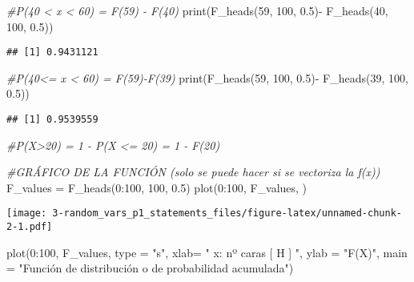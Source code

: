 \documentclass[
]{article}
\newenvironment{Shaded}{\begin{snugshade}}{\end{snugshade}}
\newcommand{\AttributeTok}[1]{\textcolor[rgb]{0.77,0.63,0.00}{#1}}
\newcommand{\CommentTok}[1]{\textcolor[rgb]{0.56,0.35,0.01}{\textit{#1}}}
\newcommand{\DecValTok}[1]{\textcolor[rgb]{0.00,0.00,0.81}{#1}}
\newcommand{\FloatTok}[1]{\textcolor[rgb]{0.00,0.00,0.81}{#1}}
\newcommand{\FunctionTok}[1]{\textcolor[rgb]{0.00,0.00,0.00}{#1}}
\newcommand{\NormalTok}[1]{#1}
\newcommand{\OtherTok}[1]{\textcolor[rgb]{0.56,0.35,0.01}{#1}}
\newcommand{\SpecialCharTok}[1]{\textcolor[rgb]{0.00,0.00,0.00}{#1}}
\newcommand{\StringTok}[1]{\textcolor[rgb]{0.31,0.60,0.02}{#1}}
\begin{document}
\begin{Shaded}
\begin{Highlighting}[]
\CommentTok{\#P(40 \textless{} x \textless{} 60) = F(59) {-} F(40)}
\FunctionTok{print}\NormalTok{(}\FunctionTok{F\_heads}\NormalTok{(}\DecValTok{59}\NormalTok{, }\DecValTok{100}\NormalTok{, }\FloatTok{0.5}\NormalTok{)}\SpecialCharTok{{-}} \FunctionTok{F\_heads}\NormalTok{(}\DecValTok{40}\NormalTok{, }\DecValTok{100}\NormalTok{, }\FloatTok{0.5}\NormalTok{))}
\end{Highlighting}
\end{Shaded}

\begin{verbatim}
## [1] 0.9431121
\end{verbatim}

\begin{Shaded}
\begin{Highlighting}[]
\CommentTok{\#P(40\textless{}= x \textless{} 60) = F(59){-}F(39)}
\FunctionTok{print}\NormalTok{(}\FunctionTok{F\_heads}\NormalTok{(}\DecValTok{59}\NormalTok{, }\DecValTok{100}\NormalTok{, }\FloatTok{0.5}\NormalTok{)}\SpecialCharTok{{-}} \FunctionTok{F\_heads}\NormalTok{(}\DecValTok{39}\NormalTok{, }\DecValTok{100}\NormalTok{, }\FloatTok{0.5}\NormalTok{))}
\end{Highlighting}
\end{Shaded}

\begin{verbatim}
## [1] 0.9539559
\end{verbatim}

\begin{Shaded}
\begin{Highlighting}[]
\CommentTok{\#P(X\textgreater{}20) = 1 {-} P(X \textless{}= 20) = 1 {-} F(20)}

\CommentTok{\#GRÁFICO DE LA FUNCIÓN (solo se puede hacer si se vectoriza la f(x))}
\NormalTok{  F\_values }\OtherTok{=} \FunctionTok{F\_heads}\NormalTok{(}\DecValTok{0}\SpecialCharTok{:}\DecValTok{100}\NormalTok{, }\DecValTok{100}\NormalTok{, }\FloatTok{0.5}\NormalTok{)}
  \FunctionTok{plot}\NormalTok{(}\DecValTok{0}\SpecialCharTok{:}\DecValTok{100}\NormalTok{, F\_values, )}
\end{Highlighting}
\end{Shaded}

\texttt{[image: 3-random\_vars\_p1\_statements\_files/figure-latex/unnamed-chunk-2-1.pdf]}

\begin{Shaded}
\begin{Highlighting}[]
  \FunctionTok{plot}\NormalTok{(}\DecValTok{0}\SpecialCharTok{:}\DecValTok{100}\NormalTok{, F\_values, }\AttributeTok{type =} \StringTok{"s"}\NormalTok{, }\AttributeTok{xlab=} \StringTok{" x: nº caras [ H ] "}\NormalTok{, }\AttributeTok{ylab =} \StringTok{"F(X)"}\NormalTok{, }
       \AttributeTok{main =} \StringTok{"Función de distribución  o de probabilidad acumulada"}\NormalTok{)}
\end{Highlighting}
\end{Shaded}
\end{document}
